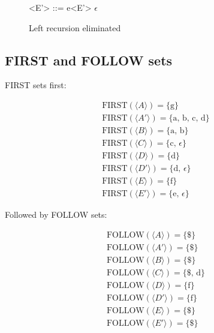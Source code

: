 \documentclass[twoside]{article}
\begin{document}
\begin{multicols}{2}
\begin{figure}[H]
\begin{grammar}
            <E'>    ::= e<E'>
            \alt $\epsilon$
        \end{grammar}
        \caption{Left recursion eliminated} \label{fig:prob1asolved}
    \end{figure}

    \newpage
    \subsection{FIRST and FOLLOW sets}

    FIRST sets first:

    \begin{gather*}
        \textrm{FIRST}(\langle A \rangle)   = \{ \textrm{g} \} \\
        \textrm{FIRST}(\langle A' \rangle)  = \{ \textrm{a, b, c, d} \} \\
        \textrm{FIRST}(\langle B \rangle)   = \{ \textrm{a, b} \} \\
        \textrm{FIRST}(\langle C \rangle)   = \{ \textrm{c, } \epsilon \} \\
        \textrm{FIRST}(\langle D \rangle)   = \{ \textrm{d} \} \\
        \textrm{FIRST}(\langle D' \rangle)  = \{ \textrm{d, } \epsilon \} \\
        \textrm{FIRST}(\langle E \rangle)   = \{ \textrm{f} \} \\
        \textrm{FIRST}(\langle E' \rangle)  = \{ \textrm{e, } \epsilon \}
    \end{gather*}

    Followed by FOLLOW sets:

    \begin{gather*}
        \textrm{FOLLOW}(\langle A \rangle)  = \{ \textrm{\$} \} \\
        \textrm{FOLLOW}(\langle A' \rangle) = \{ \textrm{\$} \} \\
        \textrm{FOLLOW}(\langle B \rangle)  = \{ \textrm{\$} \} \\
        \textrm{FOLLOW}(\langle C \rangle)  = \{ \textrm{\$, d} \} \\
        \textrm{FOLLOW}(\langle D \rangle)  = \{ \textrm{f} \} \\
        \textrm{FOLLOW}(\langle D' \rangle) = \{ \textrm{f} \} \\
        \textrm{FOLLOW}(\langle E \rangle)  = \{ \textrm{\$} \} \\
        \textrm{FOLLOW}(\langle E' \rangle) = \{ \textrm{\$} \} \\
    \end{gather*}


\end{multicols}
\end{document}
